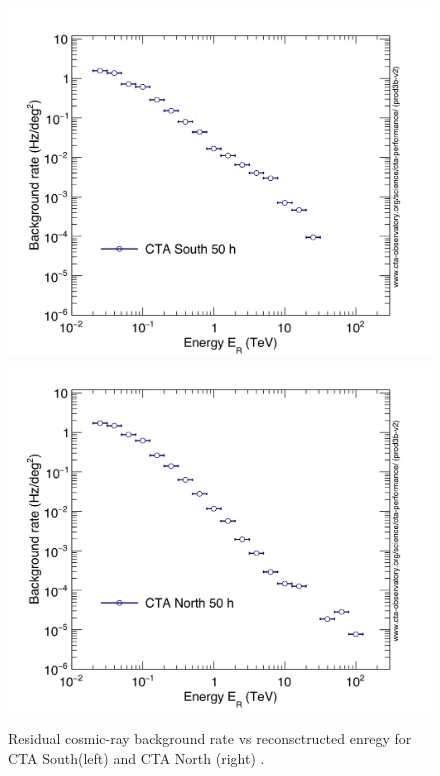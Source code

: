 \documentclass[main.tex]{subfiles}
\begin{document}
\begin{itemize}
  \begin{figure}[!htb]
    \includegraphics[width=\linewidth]{Pictures/CTA-Performance-prod3b-v2-South-20deg-BackgroundRateSquDeg.pdf}
    \endminipage\hfill
    \includegraphics[width=\linewidth]{Pictures/CTA-Performance-prod3b-v2-North-20deg-BackgroundRateSquDeg.pdf}
    \endminipage\hfill
    \caption{\label{fig:bkgrate} Residual cosmic-ray background rate vs reconsctructed enregy for CTA South(left) and CTA North (right) \cite{CTAPerformance}.}
  \end{figure}
  

\end{itemize}
\end{document}
